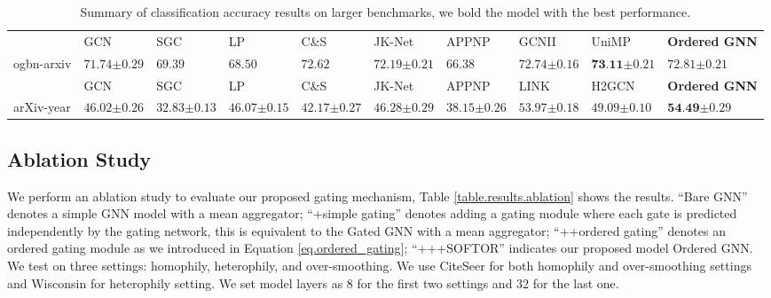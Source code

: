 \documentclass{article}
\begin{document}
\begin{table}
\caption{Summary of classification accuracy results on larger benchmarks, we bold the model with the best performance.}
\label{table.results.larger_benchmark}
\centering
\resizebox{\textwidth}{!}
{
\begin{tabular}{l|ll|ll|ll|ll|l}
\toprule
& GCN & SGC & LP & C\&S & JK-Net & APPNP & GCNII & UniMP & \textbf{Ordered GNN} \\
ogbn-arxiv & $71.74{\scriptstyle\pm0.29}$ & $69.39$ & $68.50$ & $72.62$ & $72.19{\scriptstyle\pm0.21}$ & $66.38$ & $72.74{\scriptstyle\pm0.16}$ & $\textbf{73.11}{\scriptstyle\pm0.21}$ & $72.81{\scriptstyle\pm0.21}$ \\
\midrule
& GCN & SGC & LP & C\&S & JK-Net & APPNP & LINK & H2GCN & \textbf{Ordered GNN} \\
arXiv-year & $46.02{\scriptstyle\pm0.26}$ & $32.83{\scriptstyle\pm0.13}$ & $46.07{\scriptstyle\pm0.15}$ & $42.17{\scriptstyle\pm0.27}$ & $46.28{\scriptstyle\pm0.29}$ & $38.15{\scriptstyle\pm0.26}$ & $53.97{\scriptstyle\pm0.18}$ & $49.09{\scriptstyle\pm0.10}$ & $\textbf{54.49}{\scriptstyle\pm0.29}$ \\
\bottomrule
\end{tabular}
}
\end{table}


\subsection{Ablation Study}

We perform an ablation study to evaluate our proposed gating mechanism, Table \ref{table.results.ablation} shows the results. ``Bare GNN'' denotes a simple GNN model with a mean aggregator; ``+simple gating'' denotes adding a gating module where each gate is predicted independently by the gating network, this is equivalent to the Gated GNN \citep{li2015gated} with a mean aggregator; ``++ordered gating'' denotes an ordered gating module as we introduced in Equation \ref{eq.ordered_gating}; ``+++SOFTOR'' indicates our proposed model Ordered GNN. We test on three settings: homophily, heterophily, and over-smoothing. We use CiteSeer for both homophily and over-smoothing settings and Wisconsin for heterophily setting. We set model layers as 8 for the first two settings and 32 for the last one.
\end{document}
